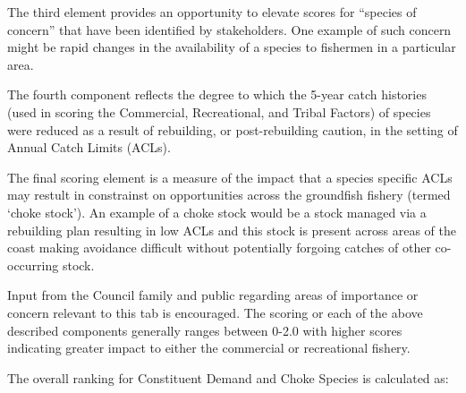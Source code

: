 \documentclass[11pt,
  english,
  a4paper,
]{article}
\begin{document}
\leavevmode\tagmcend\tagstructend\par


The third element provides an opportunity to elevate scores for ``species of concern'' that have been identified by stakeholders. One example of such concern might be rapid changes in the availability of a species to fishermen in a particular area.

\leavevmode\tagmcend\tagstructend\par


The fourth component reflects the degree to which the 5-year catch histories (used in scoring the Commercial, Recreational, and Tribal Factors) of species were reduced as a result of rebuilding, or post-rebuilding caution, in the setting of Annual Catch Limits (ACLs).

\leavevmode\tagmcend\tagstructend\par


The final scoring element is a measure of the impact that a species specific ACLs may restult in constrainst on opportunities across the groundfish fishery (termed `choke stock'). An example of a choke stock would be a stock managed via a rebuilding plan resulting in low ACLs and this stock is present across areas of the coast making avoidance difficult without potentially forgoing catches of other co-occurring stock.

\leavevmode\tagmcend\tagstructend\par


Input from the Council family and public regarding areas of importance or concern relevant to this tab is encouraged. The scoring or each of the above described components generally ranges between 0-2.0 with higher scores indicating greater impact to either the commercial or recreational fishery.

\leavevmode\tagmcend\tagstructend\par


The overall ranking for Constituent Demand and Choke Species is calculated as:

\leavevmode\tagmcend\tagstructend\par
\end{document}
